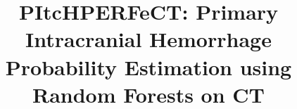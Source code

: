 \documentclass{elsarticle_nonatbib}\usepackage[]{graphicx}\usepackage[]{color}
\begin{document}
\begin{frontmatter}

\date{}

\title{PItcHPERFeCT: Primary Intracranial Hemorrhage Probability Estimation using Random Forests on CT}









\address[jhsph]{Department of Biostatistics, Bloomberg School of Public Health, Johns Hopkins University, Baltimore, MD, USA}
\address[jhmi]{Department of Neurology, Division of Brain Injury Outcomes,  Johns Hopkins Medical Institutions, Baltimore, MD, USA}
\address[ucla]{Department of Neurosurgery, David Geffen School of Medicine at UCLA, Los Angeles, CA, USA}


\begin{abstract}


\end{abstract}
\end{frontmatter}
\end{document}
